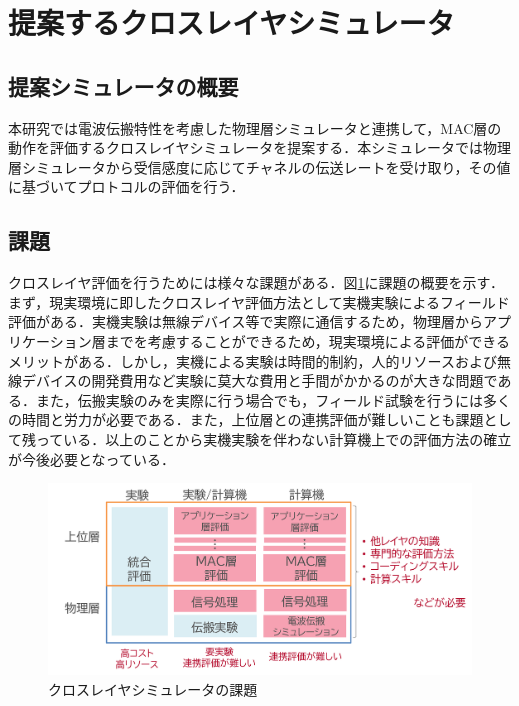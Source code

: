 \documentclass[a4paper,10pt]{ltjsarticle}
\begin{document}
\clearpage
\section{提案するクロスレイヤシミュレータ}
\subsection{提案シミュレータの概要}
本研究では電波伝搬特性を考慮した物理層シミュレータと連携して，MAC層の動作を評価するクロスレイヤシミュレータを提案する．本シミュレータでは物理層シミュレータから受信感度に応じてチャネルの伝送レートを受け取り，その値に基づいてプロトコルの評価を行う．




\subsection{課題}

クロスレイヤ評価を行うためには様々な課題がある．図\ref{fig:problem}に課題の概要を示す．まず，現実環境に即したクロスレイヤ評価方法として実機実験によるフィールド評価がある．実機実験は無線デバイス等で実際に通信するため，物理層からアプリケーション層までを考慮することができるため，現実環境による評価ができるメリットがある．しかし，実機による実験は時間的制約，人的リソースおよび無線デバイスの開発費用など実験に莫大な費用と手間がかかるのが大きな問題である．また，伝搬実験のみを実際に行う場合でも，フィールド試験を行うには多くの時間と労力が必要である．また，上位層との連携評価が難しいことも課題として残っている．以上のことから実機実験を伴わない計算機上での評価方法の確立が今後必要となっている\cite{book2}．

\begin{figure}[H]
  \centering
  \includegraphics[width=\textwidth]{./assets/課題.png}
  \caption{クロスレイヤシミュレータの課題}
  \label{fig:problem}
\end{figure}


\clearpage
\end{document}
